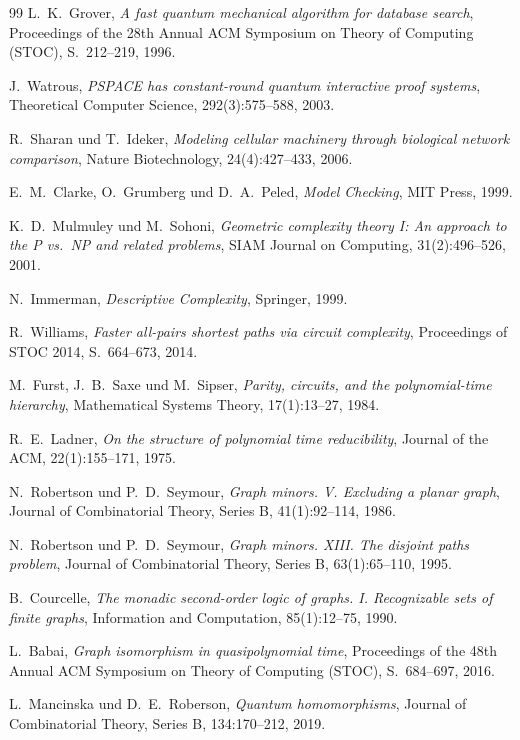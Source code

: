 ﻿\documentclass[a4paper,12pt]{article}
\theoremstyle{definition}
\begin{document}
\begin{thebibliography}{99}
  L.~K.~Grover,
  \textit{A fast quantum mechanical algorithm for database search},
  Proceedings of the 28th Annual ACM Symposium on Theory of Computing (STOC),
  S.~212--219, 1996.

  J.~Watrous,
  \textit{PSPACE has constant-round quantum interactive proof systems},
  Theoretical Computer Science, 292(3):575--588, 2003.

  R.~Sharan und T.~Ideker,
  \textit{Modeling cellular machinery through biological network comparison},
  Nature Biotechnology, 24(4):427--433, 2006.

  E.~M.~Clarke, O.~Grumberg und D.~A.~Peled,
  \textit{Model Checking},
  MIT Press, 1999.

  K.~D.~Mulmuley und M.~Sohoni,
  \textit{Geometric complexity theory I: An approach to the P vs.\ NP
          and related problems},
  SIAM Journal on Computing, 31(2):496--526, 2001.

  N.~Immerman,
  \textit{Descriptive Complexity},
  Springer, 1999.

  R.~Williams,
  \textit{Faster all-pairs shortest paths via circuit complexity},
  Proceedings of STOC 2014, S.~664--673, 2014.

  M.~Furst, J.~B.~Saxe und M.~Sipser,
  \textit{Parity, circuits, and the polynomial-time hierarchy},
  Mathematical Systems Theory, 17(1):13--27, 1984.

  R.~E.~Ladner,
  \textit{On the structure of polynomial time reducibility},
  Journal of the ACM, 22(1):155--171, 1975.

  N.~Robertson und P.~D.~Seymour,
  \textit{Graph minors. V. Excluding a planar graph},
  Journal of Combinatorial Theory, Series B, 41(1):92--114, 1986.

  N.~Robertson und P.~D.~Seymour,
  \textit{Graph minors. XIII. The disjoint paths problem},
  Journal of Combinatorial Theory, Series B, 63(1):65--110, 1995.

  B.~Courcelle,
  \textit{The monadic second-order logic of graphs. I. Recognizable sets of finite graphs},
  Information and Computation, 85(1):12--75, 1990.

  L.~Babai,
  \textit{Graph isomorphism in quasipolynomial time},
  Proceedings of the 48th Annual ACM Symposium on Theory of Computing (STOC),
  S.~684--697, 2016.

  L.~Mancinska und D.~E.~Roberson,
  \textit{Quantum homomorphisms},
  Journal of Combinatorial Theory, Series B, 134:170--212, 2019.

\end{thebibliography}
\end{document}
